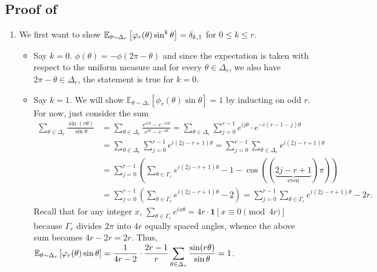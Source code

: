 \subsection{Proof of }\label{proof:2}
\begin{enumerate}[label=(\alph*)]
\item We first want to show $\displaystyle\mathbb E_{\theta\sim \Delta_{r}}\left[\varphi_{r}(\theta)\sin^{k}\theta\right] = \delta_{k,1}$ for $0\le k\le r$.

\begin{itemize}
\item Say $k=0$. $\phi(\theta) = -\phi(2\pi-\theta)$ and since the expectation is taken with respect to the uniform measure and for every $\theta\in \Delta_{r}$, we also have $2\pi-\theta\in \Delta_{r}$, the statement is true for $k=0$.
\item Say $k=1$. We will show $\mathbb E_{\theta\sim \Delta_{r}}\left[\phi_{r}(\theta)\sin\theta\right] = 1$ by inducting on odd $r$. For now, just consider the sum \begin{align*}
\sum_{\theta\in\Delta_{r}}\frac{\sin(r\theta)}{\sin\theta} &= \sum_{\theta\in\Delta_{r}}\frac{e^{ir\theta} - e^{-ir\theta}}{e^{i\theta}-e^{-i\theta}}
= \sum_{\theta\in\Delta_{r}} \sum_{j=0}^{r-1} e^{ij\theta}\cdot e^{-i(r-1-j)\theta}\\
&= \sum_{\theta\in\Delta_{r}} \sum_{j=0}^{r-1} e^{i(2j-r+1)\theta} 
= \sum_{j=0}^{r-1}\sum_{\theta\in\Delta_{r}} e^{i(2j-r+1)\theta}\\
&= \sum_{j=0}^{r-1} \left(\sum_{\theta\in\Gamma_{r}} e^{i(2j-r+1)\theta} - 1 - \cos((\underbrace{2j-r+1}_{\text{even}})\pi) \right)\\
&= \sum_{j=0}^{r-1} \left(\sum_{\theta\in\Gamma_{r}} e^{i(2j-r+1)\theta} - 2 \right) = \sum_{j=0}^{r-1} \sum_{\theta\in\Gamma_{r}} e^{i(2j-r+1)\theta} - 2r.
\end{align*} 
Recall that for any integer $x$, $\sum_{\theta\in \Gamma_{r}}e^{ix\theta} = 4r\cdot \pmb 1[x \equiv 0\pmod{4r}]$ because $\Gamma_{r}$ divides $2\pi$ into $4r$ equally spaced angles, whence the above sum becomes $4r-2r=2r$. Thus, $\displaystyle\mathbb E_{\theta\sim \Delta_{r}}\left[\varphi_{r}(\theta)\sin\theta\right] = \frac{1}{4r-2}\cdot \frac{2r-1}{r}\sum_{\theta\in\Delta_{r}}\frac{\sin(r\theta)}{\sin\theta} = 1$.

\end{itemize}
\end{enumerate}
